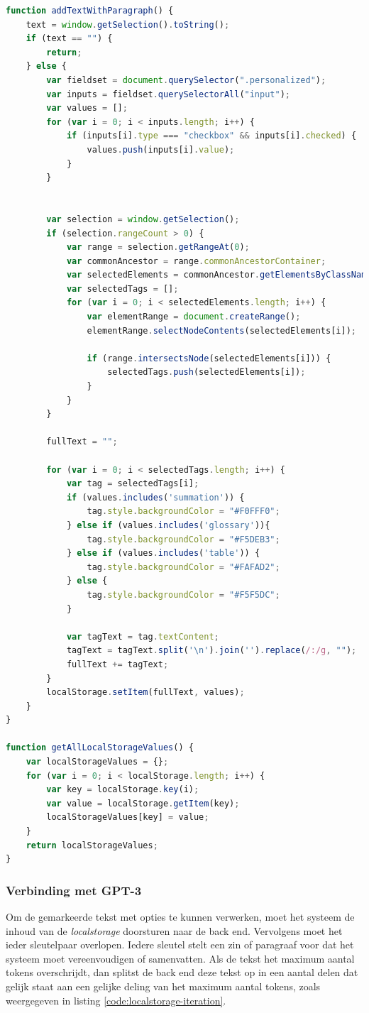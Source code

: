 \begin{lstlisting}[language=javascript, caption={Implementatie rond localstorage en tekst markeren.}, label={listing:localstorage}]
function addTextWithParagraph() {
	text = window.getSelection().toString();
	if (text == "") {
		return;
	} else {
		var fieldset = document.querySelector(".personalized");
		var inputs = fieldset.querySelectorAll("input");
		var values = [];
		for (var i = 0; i < inputs.length; i++) {
			if (inputs[i].type === "checkbox" && inputs[i].checked) {
				values.push(inputs[i].value);
			}
		}
		
		
		var selection = window.getSelection();
		if (selection.rangeCount > 0) {
			var range = selection.getRangeAt(0);
			var commonAncestor = range.commonAncestorContainer;
			var selectedElements = commonAncestor.getElementsByClassName("sentence");
			var selectedTags = [];
			for (var i = 0; i < selectedElements.length; i++) {
				var elementRange = document.createRange();
				elementRange.selectNodeContents(selectedElements[i]);
				
				if (range.intersectsNode(selectedElements[i])) {
					selectedTags.push(selectedElements[i]);
				}
			}
		}
		
		fullText = "";
		
		for (var i = 0; i < selectedTags.length; i++) {
			var tag = selectedTags[i];
			if (values.includes('summation')) {
				tag.style.backgroundColor = "#F0FFF0";
			} else if (values.includes('glossary')){
				tag.style.backgroundColor = "#F5DEB3";
			} else if (values.includes('table')) {
				tag.style.backgroundColor = "#FAFAD2";
			} else {
				tag.style.backgroundColor = "#F5F5DC";
			}
			
			var tagText = tag.textContent;
			tagText = tagText.split('\n').join('').replace(/:/g, "");
			fullText += tagText;
		}
		localStorage.setItem(fullText, values);
	}
}

function getAllLocalStorageValues() {
	var localStorageValues = {};
	for (var i = 0; i < localStorage.length; i++) {
		var key = localStorage.key(i);
		var value = localStorage.getItem(key);
		localStorageValues[key] = value;
	}
	return localStorageValues;
}
\end{lstlisting}

\subsubsection{Verbinding met GPT-3}

Om de gemarkeerde tekst met opties te kunnen verwerken, moet het systeem de inhoud van de \textit{localstorage} doorsturen naar de back end. Vervolgens moet het ieder sleutelpaar overlopen. Iedere sleutel stelt een zin of paragraaf voor dat het systeem moet vereenvoudigen of samenvatten. Als de tekst het maximum aantal tokens overschrijdt, dan splitst de back end deze tekst op in een aantal delen dat gelijk staat aan een gelijke deling van het maximum aantal tokens, zoals weergegeven in listing \ref{code:localstorage-iteration}.

